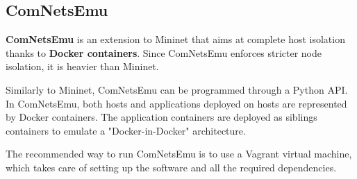 \subsection{ComNetsEmu}
\label{sec:bg/network/comnetsemu}

\textbf{ComNetsEmu} is an extension to Mininet that aims at complete host isolation thanks to \textbf{Docker containers}. Since ComNetsEmu enforces stricter node isolation, it is heavier than Mininet.

Similarly to Mininet, ComNetsEmu can be programmed through a Python API. In ComNetsEmu, both hosts and applications deployed on hosts are represented by Docker containers. The application containers are deployed as siblings containers to emulate a "Docker-in-Docker" architecture.

The recommended way to run ComNetsEmu is to use a Vagrant virtual machine, which takes care of setting up the software and all the required dependencies.\cite{comnetsemu}

